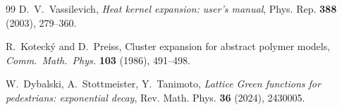 \begin{thebibliography}{99}
D.~V.~Vassilevich, \emph{Heat kernel expansion: user's manual}, Phys. Rep. \textbf{388} (2003), 279--360.

R.~Koteck\'y and D.~Preiss, Cluster expansion for abstract polymer models, \emph{Comm.\ Math.\ Phys.} \textbf{103} (1986), 491--498.

W.~Dybalski, A.~Stottmeister, Y.~Tanimoto, \emph{Lattice Green functions for pedestrians: exponential decay}, Rev. Math. Phys. \textbf{36} (2024), 2430005.

\end{thebibliography}
